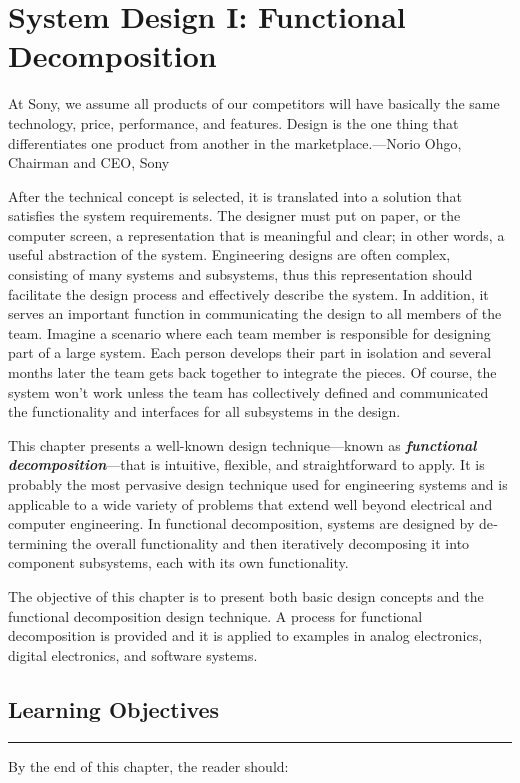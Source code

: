 \chapter{System Design I: Functional Decomposition}
\graphicspath{ {./chapter05/Fig} }

\begin{itquote}
At Sony, we assume all products of our competitors will have basically
the same technology, price, performance, and features. Design is the one
thing that differentiates one product from another in the
marketplace.---Norio Ohgo, Chairman and CEO, Sony
\end{itquote}

After the technical concept is selected, it is translated into a
solution that satisfies the system require­ments. The designer must put
on paper, or the computer screen, a representation that is meaning­ful
and clear; in other words, a useful abstraction of the system.
Engineering designs are often com­plex, consisting of many systems and
subsystems, thus this representation should facilitate the design
process and effectively describe the system. In addition, it serves an
im­portant function in communicat­ing the design to all members of the
team. Imag­ine a scenario where each team member is responsible for
designing part of a large system. Each person de­velops their part in
isolation and several months later the team gets back together to
integrate the pieces. Of course, the system won't work unless the team
has collectively defined and communicated the functionality and
interfaces for all subsystems in the design.

This chapter presents a well-known design technique---known as
\emph{\textbf{functional decomposi­tion}}---that is intuitive, flexible,
and straightforward to apply. It is probably the most pervasive design
technique used for engineering systems and is applicable to a wide
variety of prob­lems that extend well be­yond electrical and computer
engineering. In functional decomposition, systems are designed by
de­termining the overall functionality and then iteratively decomposing
it into component subsys­tems, each with its own functionality.

The objective of this chapter is to present both basic design concepts
and the functional decomposition design technique. A process for
functional decomposition is provided and it is applied to examples in
analog electronics, digital electronics, and software systems.

\section*{Learning Objectives}
\noindent\rule{\linewidth}{1pt}
By the end of this chapter, the reader should:

